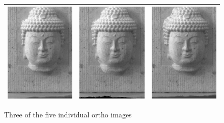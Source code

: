 \begin{figure}
\begin{tabular}{||c|c|c||}
   \hline \hline
   \includegraphics[width=55mm]{FIGS/Boudhas/Ort_IMG_5588.jpg}   &
   \includegraphics[width=55mm]{FIGS/Boudhas/Ort_IMG_5589.jpg}   &
   \includegraphics[width=55mm]{FIGS/Boudhas/Ort_IMG_5592.jpg}   \\ \hline  \hline
\end{tabular}
\label{Indiv:Ortho}
\caption{Three of the five individual ortho images}
\end{figure}



